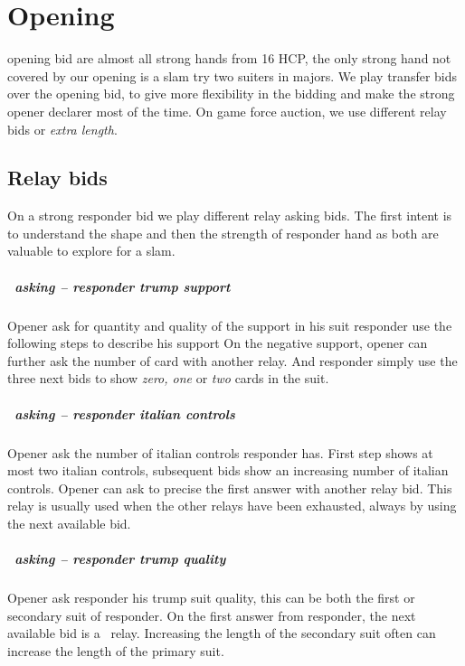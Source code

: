 \chapter{\bid{1\CS} Opening}
\bid{1\CS} opening bid are almost all strong hands from 16 HCP, the only strong hand not covered by our \bid{1\CS} opening is a slam try two suiters in majors. We play transfer bids over the opening bid, to give more flexibility in the bidding and make the strong opener declarer most of the time. On game force auction, we use different relay bids or \emph{extra length}.
\section{Relay bids}
On a strong responder bid we play different relay asking bids. The first intent is to understand the shape and then the strength of responder hand as both are valuable to explore for a slam.
\paragraph{\alphaRelay\ asking – responder trump support}
Opener ask for quantity and quality of the support in his suit responder use the following steps to describe his support
On the negative support, opener can further ask the number of card with another relay. And responder simply use the three next bids to show \emph{zero, one} or \emph{two} cards in the suit.
\paragraph{\betaRelay\ asking – responder italian controls}
Opener ask the number of italian controls responder has. First step shows at most two italian controls, subsequent bids show an increasing number of italian controls. Opener can ask to precise the first answer with another relay bid. This relay is usually used when the other relays have been exhausted, always by using the next available bid.
\paragraph{\gammaRelay\ asking – responder trump quality}
Opener ask responder his trump suit quality, this can be both the first or secondary suit of responder.
On the first answer from responder, the next available bid is a \gammaRelay\ relay. Increasing the length of the secondary suit often can increase the length of the primary suit.
